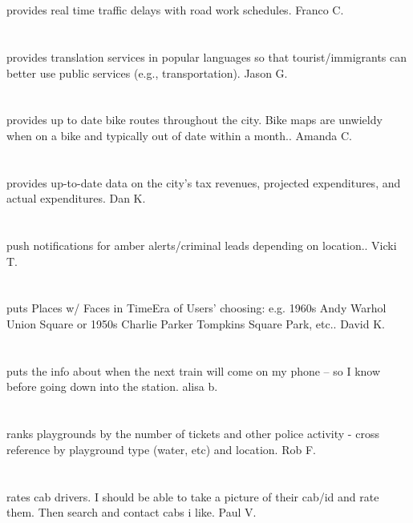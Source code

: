 \section{}provides real time traffic delays with road work schedules. Franco C.
\section{}provides translation services in popular languages so that tourist/immigrants can better use public services (e.g.,  transportation). Jason G.
\section{}provides up to date bike routes throughout the city.  Bike maps are unwieldy when on a bike and typically out of date within a month.. Amanda C.
\section{}provides up-to-date data on the city's tax revenues,  projected expenditures,  and actual expenditures. Dan K.
\section{}push notifications for amber alerts/criminal leads depending on location.. Vicki T.
\section{}puts Places w/ Faces in TimeEra of Users' choosing: e.g. 1960s Andy Warhol Union Square or 1950s Charlie Parker Tompkins Square Park,  etc.. David K.
\section{}puts the info about when the next train will come on my phone -- so I know before going down into the station. alisa b.
\section{}ranks playgrounds by the number of tickets and other police activity - cross reference by playground type (water,  etc) and location. Rob F.
\section{}rates cab drivers.  I should be able to take a picture of their cab/id and rate them. Then search and contact cabs i like. Paul V.
